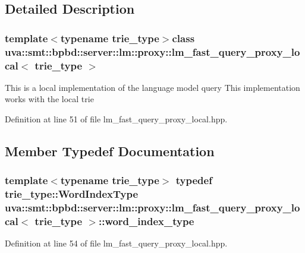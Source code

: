 \subsection{Detailed Description}
\subsubsection*{template$<$typename trie\+\_\+type$>$class uva\+::smt\+::bpbd\+::server\+::lm\+::proxy\+::lm\+\_\+fast\+\_\+query\+\_\+proxy\+\_\+local$<$ trie\+\_\+type $>$}

This is a local implementation of the language model query This implementation works with the local trie 

Definition at line 51 of file lm\+\_\+fast\+\_\+query\+\_\+proxy\+\_\+local.\+hpp.



\subsection{Member Typedef Documentation}
\hypertarget{classuva_1_1smt_1_1bpbd_1_1server_1_1lm_1_1proxy_1_1lm__fast__query__proxy__local_a4c2aa6b7e82b20c0e66095486c020d34}{}
\subsubsection[{word\+\_\+index\+\_\+type}]{\setlength{\rightskip}{0pt plus 5cm}template$<$typename trie\+\_\+type$>$ typedef trie\+\_\+type\+::\+Word\+Index\+Type {\bf uva\+::smt\+::bpbd\+::server\+::lm\+::proxy\+::lm\+\_\+fast\+\_\+query\+\_\+proxy\+\_\+local}$<$ trie\+\_\+type $>$\+::{\bf word\+\_\+index\+\_\+type}}\label{classuva_1_1smt_1_1bpbd_1_1server_1_1lm_1_1proxy_1_1lm__fast__query__proxy__local_a4c2aa6b7e82b20c0e66095486c020d34}


Definition at line 54 of file lm\+\_\+fast\+\_\+query\+\_\+proxy\+\_\+local.\+hpp.




